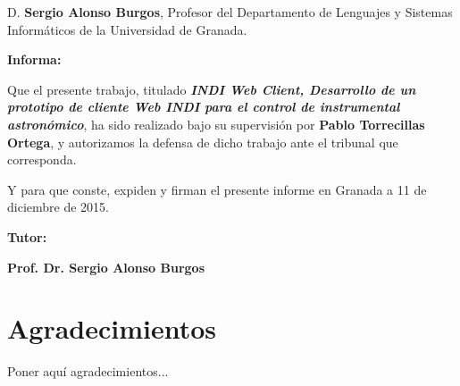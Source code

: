 D. \textbf{Sergio Alonso Burgos}, Profesor del Departamento de Lenguajes y Sistemas Informáticos de la Universidad de Granada.

\vspace{0.5cm}

\textbf{Informa:}

\vspace{0.5cm}

Que el presente trabajo, titulado \textit{\textbf{INDI Web Client, Desarrollo de un prototipo de cliente Web INDI para el control de instrumental astronómico}},
ha sido realizado bajo su supervisión por \textbf{Pablo Torrecillas Ortega}, y autorizamos la defensa de dicho trabajo ante el tribunal
que corresponda.

\vspace{0.5cm}

Y para que conste, expiden y firman el presente informe en Granada a 11 de diciembre de 2015.

\vspace{1cm}

\textbf{Tutor:}

\vspace{5cm}

\noindent \textbf{Prof. Dr. Sergio Alonso Burgos }

\chapter*{Agradecimientos}
\thispagestyle{empty}

       \vspace{1cm}


Poner aquí agradecimientos...
